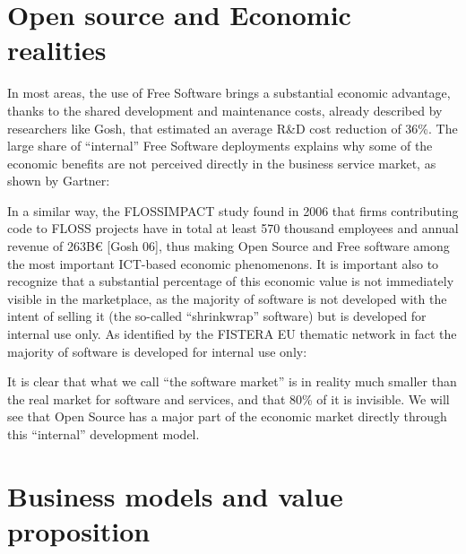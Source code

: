 \section*{Open source and Economic realities}

In most areas, the use of Free Software brings a substantial economic advantage, thanks to the shared development and maintenance costs, already described by researchers like Gosh, that estimated an average R\&D cost reduction of 36\%. The large share of “internal” Free Software deployments explains why some of the economic benefits are not perceived directly in the business service market, as shown by Gartner:

In a similar way, the FLOSSIMPACT study found in 2006 that firms contributing code to FLOSS projects have in total at least 570 thousand employees and annual revenue of 263B€ [Gosh 06], thus making Open Source and Free software among the most important ICT-based economic phenomenons. It is important also to recognize that a substantial percentage of this economic value is not immediately visible in the marketplace, as the majority of software is not developed with the intent of selling it (the so-called “shrinkwrap” software) but is developed for internal use only. As identified by the FISTERA EU thematic network in fact the majority of software is developed for internal use only:

It is clear that what we call “the software market” is in reality much smaller than the real market for software and services, and that 80\% of it is invisible. We will see that Open Source has a major part of the economic market directly through this “internal” development model.

\section*{Business models and value proposition}

